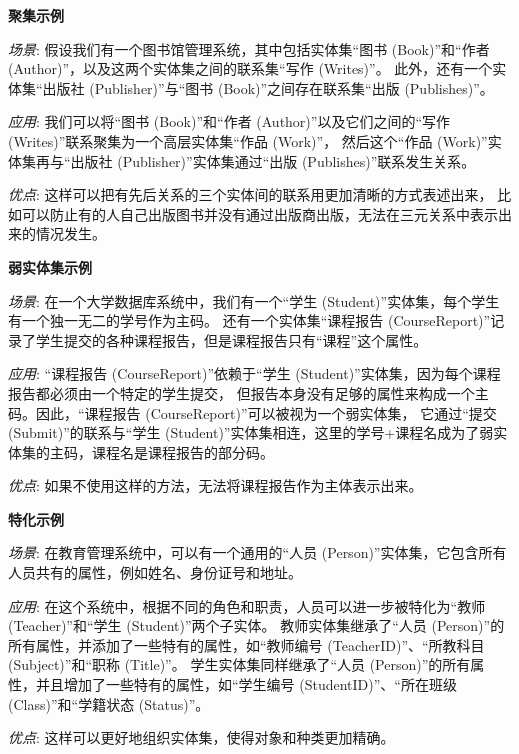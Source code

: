 \documentclass[12pt]{article} %
\makeatletter
\theoremstyle{definition}
\newenvironment{proof}[1][\protect\proofname]{\par
\normalfont\topsep6\p@\@plus6\p@\relax
\trivlist
\itemindent\parindent
\item[\hskip\labelsep
\scshape
#1]\ignorespaces
}{%
\endtrivlist\@endpefalse
}
\renewcommand{\proofname}{\it{解答}}
\makeatother
\begin{document}
\begin{proof}

\textbf{聚集示例}

\textit{场景}: 假设我们有一个图书馆管理系统，其中包括实体集“图书 (Book)”和“作者 (Author)”，以及这两个实体集之间的联系集“写作 (Writes)”。
此外，还有一个实体集“出版社 (Publisher)”与“图书 (Book)”之间存在联系集“出版 (Publishes)”。

\textit{应用}: 我们可以将“图书 (Book)”和“作者 (Author)”以及它们之间的“写作 (Writes)”联系聚集为一个高层实体集“作品 (Work)”，
然后这个“作品 (Work)”实体集再与“出版社 (Publisher)”实体集通过“出版 (Publishes)”联系发生关系。

\textit{优点}: 这样可以把有先后关系的三个实体间的联系用更加清晰的方式表述出来，
比如可以防止有的人自己出版图书并没有通过出版商出版，无法在三元关系中表示出来的情况发生。

\vspace{5mm} %

\textbf{弱实体集示例}

\textit{场景}: 在一个大学数据库系统中，我们有一个“学生 (Student)”实体集，每个学生有一个独一无二的学号作为主码。
还有一个实体集“课程报告 (CourseReport)”记录了学生提交的各种课程报告，但是课程报告只有“课程”这个属性。

\textit{应用}: “课程报告 (CourseReport)”依赖于“学生 (Student)”实体集，因为每个课程报告都必须由一个特定的学生提交，
但报告本身没有足够的属性来构成一个主码。因此，“课程报告 (CourseReport)”可以被视为一个弱实体集，
它通过“提交 (Submit)”的联系与“学生 (Student)”实体集相连，这里的学号+课程名成为了弱实体集的主码，课程名是课程报告的部分码。

\textit{优点}: 如果不使用这样的方法，无法将课程报告作为主体表示出来。

\vspace{5mm} %

\textbf{特化示例}

\textit{场景}: 在教育管理系统中，可以有一个通用的“人员 (Person)”实体集，它包含所有人员共有的属性，例如姓名、身份证号和地址。

\textit{应用}: 在这个系统中，根据不同的角色和职责，人员可以进一步被特化为“教师 (Teacher)”和“学生 (Student)”两个子实体。
教师实体集继承了“人员 (Person)”的所有属性，并添加了一些特有的属性，如“教师编号 (TeacherID)”、“所教科目 (Subject)”和“职称 (Title)”。
学生实体集同样继承了“人员 (Person)”的所有属性，并且增加了一些特有的属性，如“学生编号 (StudentID)”、“所在班级 (Class)”和“学籍状态 (Status)”。

\textit{优点}: 这样可以更好地组织实体集，使得对象和种类更加精确。


\end{proof}
\end{document}

